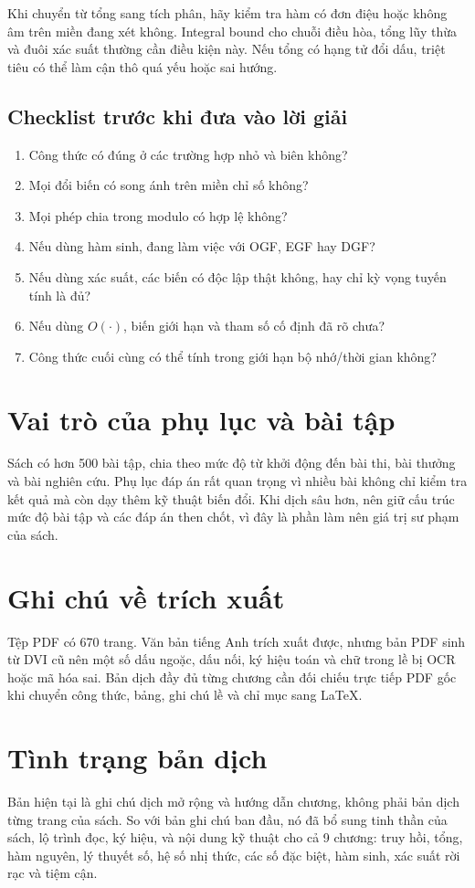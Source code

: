 \documentclass[11pt]{article}
\begin{document}
Khi chuyển từ tổng sang tích phân, hãy kiểm tra hàm có đơn điệu hoặc không âm
trên miền đang xét không. Integral bound cho chuỗi điều hòa, tổng lũy thừa và
đuôi xác suất thường cần điều kiện này. Nếu tổng có hạng tử đổi dấu, triệt tiêu
có thể làm cận thô quá yếu hoặc sai hướng.

\subsection{Checklist trước khi đưa vào lời giải}

\begin{enumerate}
  \item Công thức có đúng ở các trường hợp nhỏ và biên không?
  \item Mọi đổi biến có song ánh trên miền chỉ số không?
  \item Mọi phép chia trong modulo có hợp lệ không?
  \item Nếu dùng hàm sinh, đang làm việc với OGF, EGF hay DGF?
  \item Nếu dùng xác suất, các biến có độc lập thật không, hay chỉ kỳ vọng tuyến
        tính là đủ?
  \item Nếu dùng \(O(\cdot)\), biến giới hạn và tham số cố định đã rõ chưa?
  \item Công thức cuối cùng có thể tính trong giới hạn bộ nhớ/thời gian không?
\end{enumerate}

\section{Vai trò của phụ lục và bài tập}

Sách có hơn 500 bài tập, chia theo mức độ từ khởi động đến bài thi, bài thưởng
và bài nghiên cứu. Phụ lục đáp án rất quan trọng vì nhiều bài không chỉ kiểm
tra kết quả mà còn dạy thêm kỹ thuật biến đổi. Khi dịch sâu hơn, nên giữ cấu
trúc mức độ bài tập và các đáp án then chốt, vì đây là phần làm nên giá trị sư
phạm của sách.

\section{Ghi chú về trích xuất}

Tệp PDF có 670 trang. Văn bản tiếng Anh trích xuất được, nhưng bản PDF sinh từ
DVI cũ nên một số dấu ngoặc, dấu nối, ký hiệu toán và chữ trong lề bị OCR hoặc
mã hóa sai. Bản dịch đầy đủ từng chương cần đối chiếu trực tiếp PDF gốc khi
chuyển công thức, bảng, ghi chú lề và chỉ mục sang LaTeX.

\section{Tình trạng bản dịch}

Bản hiện tại là ghi chú dịch mở rộng và hướng dẫn chương, không phải bản dịch
từng trang của sách. So với bản ghi chú ban đầu, nó đã bổ sung tinh thần của
sách, lộ trình đọc, ký hiệu, và nội dung kỹ thuật cho cả 9 chương: truy hồi,
tổng, hàm nguyên, lý thuyết số, hệ số nhị thức, các số đặc biệt, hàm sinh, xác
suất rời rạc và tiệm cận.
\end{document}
